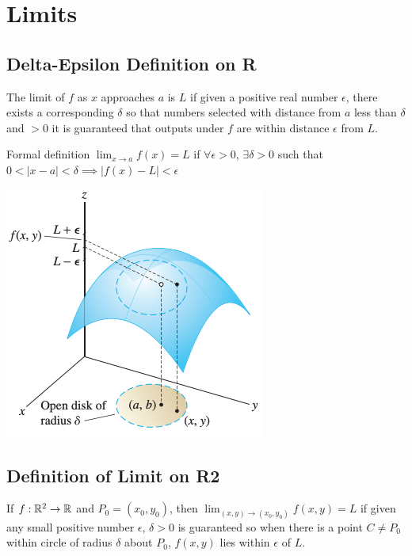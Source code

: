 \section{Limits}

\subsection{Delta-Epsilon Definition on R}

The limit of $f$ as $x$ approaches $a$ is $L$ if given a positive real number
$\epsilon$, there exists a corresponding $\delta$ so that numbers selected with distance from $a$
less than $\delta$ and $>0$ it is guaranteed that outputs under $f$ are within distance $\epsilon$ from $L$.

\begin{mybox}{Formal definition}
    $\lim_{x\to a}f(x)=L$ if $\forall \epsilon >0$, $\exists\delta > 0$ such that $0< |x-a| < \delta \implies |f(x)-L|<\epsilon$
\end{mybox}

\begin{center}
    \includegraphics[scale=0.5]{figures/Screen Shot 2021-05-12 at 3.29.55 PM.png}
\end{center}

\subsection{Definition of Limit on R2}

If $f:\mathbb{R}^2\to \mathbb{R}$ and $P_0=(x_0,y_0)$, then $\lim _{(x, y) \rightarrow\left(x_{0}, y_{0}\right)} f(x, y)=L$ 
if given any small positive number $\epsilon$, $\delta>0$ is guaranteed so when there is a point $C\neq P_0$ within circle of radius $\delta$ about $P_0$, $f(x,y)$ lies within $\epsilon$ of $L$.

